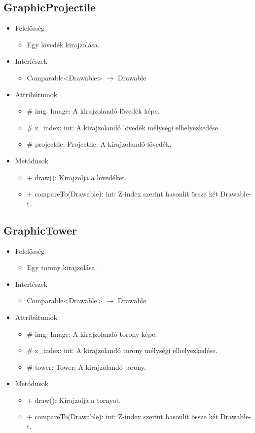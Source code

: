 \subsection{GraphicProjectile}
\begin{itemize}
\item Felelősség
\begin{itemize}
	\item Egy lövedék kirajzolása.
\end{itemize}
\item Interfészek
\begin{itemize}
	\item Comparable<Drawable> $\rightarrow$ Drawable
\end{itemize}
\item Attribútumok
	\begin{itemize}
		\item \# img: Image: A kirajzolandó lövedék képe.
		\item \# z\_index: int: A kirajzolandó lövedék mélységi elhelyezkedése.
		\item \# projectile: Projectile: A kirajzolandó lövedék.
	\end{itemize}
\item Metódusok
	\begin{itemize}
		\item + draw(): Kirajzolja a lövedéket.
		\item + compareTo(Drawable): int: Z-index szerint hasonlít össze két Drawable-t.
	\end{itemize}
\end{itemize}

\subsection{GraphicTower}
\begin{itemize}
\item Felelősség
\begin{itemize}
	\item Egy torony kirajzolása.
\end{itemize}
\item Interfészek
\begin{itemize}
	\item{} Comparable<Drawable> $\rightarrow$ Drawable
\end{itemize}
\item Attribútumok
	\begin{itemize}
		\item \# img: Image: A kirajzolandó torony képe.
		\item \# z\_index: int: A kirajzolandó torony mélységi elhelyezkedése.
		\item \# tower: Tower: A kirajzolandó torony.
	\end{itemize}
\item Metódusok
	\begin{itemize}
		\item + draw(): Kirajzolja a tornyot.
		\item + compareTo(Drawable): int: Z-index szerint hasonlít össze két Drawable-t.
	\end{itemize}
\end{itemize}


